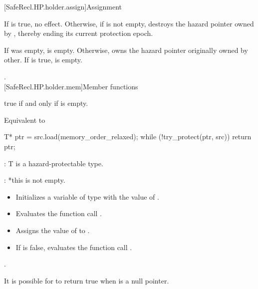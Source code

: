 [SafeRecl.HP.holder.assign]{Assignment}


\pnum
\effects If  is true, no effect. Otherwise, if  is not empty, destroys
the hazard pointer owned by , thereby ending its current protection epoch.

\pnum
\postconditions If  was empty,  is empty. Otherwise,  owns the hazard
pointer originally owned by other. If  is true,  is empty.

\pnum
\returns {}.
\\

[SafeRecl.HP.holder.mem]{Member functions}


\pnum
\returns true if and only if  is empty.
\\


\pnum
\effects Equivalent to
\begin{codeblock}
T* ptr = src.load(memory_order_relaxed);
while (!try_protect(ptr, src)) {}
return ptr;
\end{codeblock}


\pnum
{}: T is a hazard-protectable type.

\pnum
{}: *this is not empty.

\pnum
\effects
\begin{itemize}
\item Initializes a variable  of type  with the value of .
\item Evaluates the function call .
\item Assigns the value of  to .
\item If  is false, evaluates the function call .
\end{itemize}

\pnum
\returns {}. \begin{note} It is possible for  to return true when  is a null pointer. \end{note}

